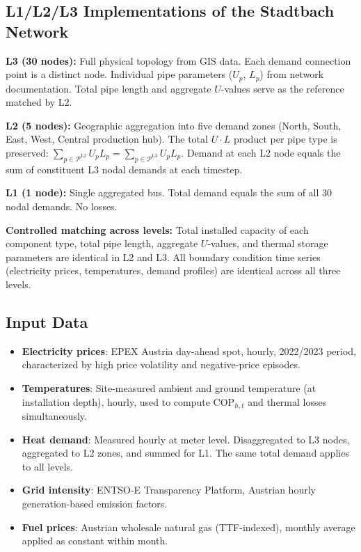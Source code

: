 \documentclass[review,3p]{elsarticle}
\begin{document}
\subsection{L1/L2/L3 Implementations of the Stadtbach Network}
\label{sec:case_levels}

\textbf{L3 (30 nodes):} Full physical topology from GIS data. Each
demand connection point is a distinct node. Individual pipe parameters
($U_p$, $L_p$) from network documentation. Total pipe length and
aggregate $U$-values serve as the reference matched by L2.

\textbf{L2 (5 nodes):} Geographic aggregation into five demand zones
(North, South, East, West, Central production hub). The total
$U \cdot L$ product per pipe type is preserved:
$\sum_{p \in \mathcal{P}^{\mathrm{L2}}} U_p L_p =
\sum_{p \in \mathcal{P}^{\mathrm{L3}}} U_p L_p$.
Demand at each L2 node equals the sum of constituent L3 nodal demands
at each timestep.

\textbf{L1 (1 node):} Single aggregated bus. Total demand equals the
sum of all 30 nodal demands. No losses.

\textbf{Controlled matching across levels:} Total installed capacity
of each component type, total pipe length, aggregate $U$-values, and
thermal storage parameters are identical in L2 and L3. All boundary
condition time series (electricity prices, temperatures, demand
profiles) are identical across all three levels.

\subsection{Input Data}
\label{sec:case_data}

\begin{itemize}
    \item \textbf{Electricity prices}: EPEX Austria day-ahead spot,
    hourly, 2022/2023 period, characterized by high price volatility
    and negative-price episodes.

    \item \textbf{Temperatures}: Site-measured ambient and ground
    temperature (at installation depth), hourly, used to compute
    $\mathrm{COP}_{h,t}$ and thermal losses simultaneously.

    \item \textbf{Heat demand}: Measured hourly at meter level.
    Disaggregated to L3 nodes, aggregated to L2 zones, and summed
    for L1. The same total demand applies to all levels.

    \item \textbf{Grid  intensity}: ENTSO-E Transparency
    Platform, Austrian hourly generation-based emission factors.

    \item \textbf{Fuel prices}: Austrian wholesale natural gas
    (TTF-indexed), monthly average applied as constant within month.
\end{itemize}
\end{document}
